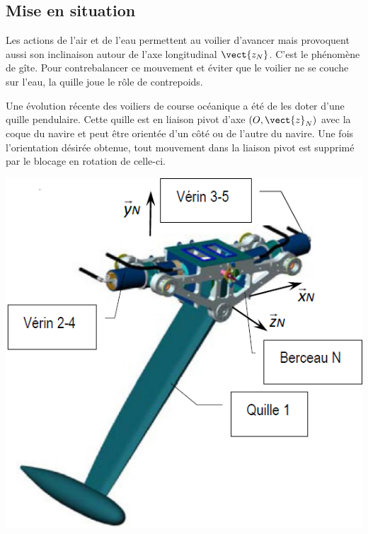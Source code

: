 \iflivret

\else

\fi
\setlength{\columnseprule}{.1pt}

\pagestyle{fancy}
\thispagestyle{plain}

\ifprof
\vspace{5.4cm}
\else
\vspace{5.4cm}
\fi

\def\columnseprulecolor{\color{ocre}}
\setlength{\columnseprule}{0.4pt} 


\setcounter{exo}{0}


\ifprof
\else
\begin{multicols}{2}
\fi

\section*{Mise en situation}
\ifprof
\else

Les actions de l'air et de l'eau permettent au voilier d'avancer mais provoquent aussi son inclinaison autour de l'axe longitudinal $\vect{z_N}$. C’est le phénomène de gîte. Pour contrebalancer ce mouvement et éviter que le voilier ne se couche sur l’eau, la quille joue le rôle de contrepoids. 



Une évolution récente des voiliers de course océanique a été de les doter d’une quille pendulaire. Cette quille est en liaison pivot d’axe $\left(O,\vect{z}_N \right)$ avec la coque du navire et peut être orientée d’un côté ou de l’autre du navire. Une fois l’orientation désirée obtenue, tout mouvement dans la liaison pivot est supprimé par le blocage en rotation de celle-ci. 

\begin{center}
\includegraphics[width=.6\linewidth]{images/fig_03}


\end{center}
\end{multicols}
